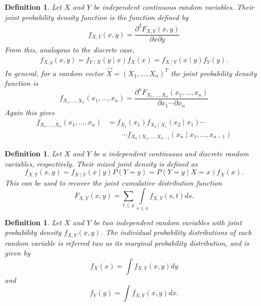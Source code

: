 \documentclass[1pt]{report}
\newtheorem{defn}[thm]{Definition}
\newcommand{\<}{\langle}
\renewcommand{\>}{\rangle}
\newcommand{\del}{\partial}
\begin{document}
\begin{defn}\label{def:jointpdf}
Let $X$ and $Y$ be independent continuous random variables. Their \emph{joint probability density function} is the function defined by
\begin{align*}
f_{X,Y}(x,y) = \dfrac{\del^2 F_{X,Y}(x,y)}{\del x \del y}
\end{align*}
From this, analogous to the discrete case,
\begin{align*}
f_{X,y}(x,y) = f_{Y\mid X}(y\mid x) f_X(x) = f_{X\mid Y}(x\mid y) f_Y(y).
\end{align*}
In general, for a random vector $\vec X = (X_1, \dots, X_n)^T$ the joint probability density function is
$$f_{X_1,\dots, X_n} (x_1,\dots, x_n) = \dfrac{\del^n F_{X_1,\dots, X_n}(x_1, \dots, x_n)}{\del x_1 \cdots \del x_n}$$
Again this gives
\begin{align*}
f_{X_1,\dots, X_n}(x_1,\dots, x_n) &= f_{X_1}(x_1) f_{X_2\mid X_1}(x_2\mid x_1) \cdots\\
& \qquad\cdots f_{X_n \mid X_1, \dots, X_{n-1}}(x_n\mid x_1,\dots, x_{n-1})
\end{align*}
\end{defn}
\begin{defn}\label{def:mixedjointdensity}
Let $X$ and $Y$ be a independent continuous and discrete random variables, respectively. Their \emph{mixed joint density} is defined as
$$f_{X,Y}(x,y) = f_{X\mid Y}(x\mid y)P(Y=y) = P(Y=y \mid X=x)f_X(x).$$
This can be used to recover the joint cumulative distribution function
$$F_{X,Y}(x,y) = \sum\limits_{t \leq y}\int\limits_{s \leq x} f_{X,Y}(s,t)ds.$$
\end{defn}
\begin{defn}\label{def:marginalprobability}
Let $X$ and $Y$ be two independent random variables with joint probability density $f_{X,Y}(x,y)$. The individual probability distributions of each random variable is referred two as its \emph{marginal probability distribution}, and is given by
$$f_X(x) = \int f_{X,Y}(x,y)dy$$
and
$$f_Y(y) = \int f_{X,Y}(x,y)dx.$$
\end{defn}
\end{document}

